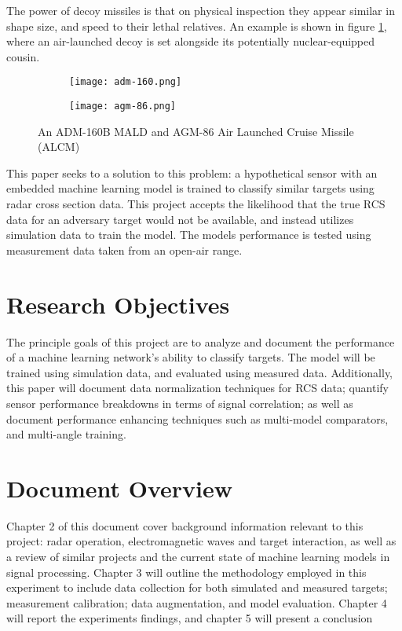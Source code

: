 The power of decoy missiles is that on physical inspection they appear similar in shape size, and speed to their lethal relatives. An example is shown in figure \ref{fig:missiles}, where an air-launched decoy is set alongside its potentially nuclear-equipped cousin.

\begin{figure}[htbp]
  \centering
  \begin{subfigure}{.5\textwidth}
    \centering
    \texttt{[image: adm-160.png]}
  \end{subfigure}%
  \begin{subfigure}{.5\textwidth}
    \centering
    \texttt{[image: agm-86.png]}
  \end{subfigure}
  \caption[Air Launched Platform Comparison]{An ADM-160B MALD and AGM-86 Air Launched Cruise Missile (ALCM)}
  \label{fig:missiles}
\end{figure}


This paper seeks to a solution to this problem:  a hypothetical sensor with an embedded machine learning model is trained to classify similar targets using radar cross section data. This project accepts the likelihood that the true RCS data for an adversary target would not be available, and instead utilizes simulation data to train the model. The models performance is tested using measurement data taken from an open-air range.


\section{Research Objectives}
\label{sec:objectives}

The principle goals of this project are to analyze and document the performance of a machine learning network's ability to classify targets. The model will be trained using simulation data, and evaluated using measured data. Additionally, this paper will document data normalization techniques for RCS data; quantify sensor performance breakdowns in terms of signal correlation; as well as document performance enhancing techniques such as multi-model comparators, and multi-angle training.

\section{Document Overview}
\label{sec:overview}

Chapter 2 of this document cover background information relevant to this project: radar operation, electromagnetic waves and target interaction, as well as a review of similar projects and the current state of machine learning models in signal processing. Chapter 3 will outline the methodology employed in this experiment to include data collection for both simulated and measured targets; measurement calibration; data augmentation, and model evaluation. Chapter 4 will report the experiments findings, and chapter 5 will present a conclusion
